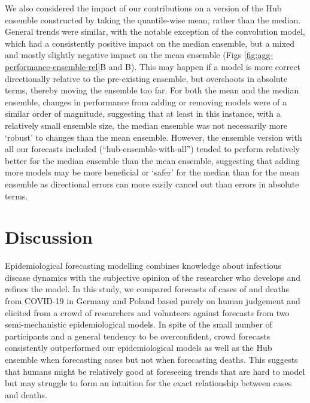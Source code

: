 \documentclass[10pt,letterpaper]{article}
\begin{document}
We also considered the impact of our contributions on a version of the
Hub ensemble constructed by taking the quantile-wise mean, rather than
the median. General trends were similar, with the notable exception of
the convolution model, which had a consistently positive impact on the
median ensemble, but a mixed and mostly slightly negative impact on the
mean ensemble (Figs \ref{fig:agg-performance-ensemble-rel}B and
B). This may happen if a
model is more correct directionally relative to the pre-existing
ensemble, but overshoots in absolute terms, thereby moving the ensemble
too far. For both the mean and the median ensemble, changes in
performance from adding or removing models were of a similar order of
magnitude, suggesting that at least in this instance, with a relatively
small ensemble size, the median ensemble was not necessarily more
`robust' to changes than the mean ensemble. However, the ensemble
version with all our forecasts included (``hub-ensemble-with-all'')
tended to perform relatively better for the median ensemble than the
mean ensemble, suggesting that adding more models may be more beneficial
or `safer' for the median than for the mean ensemble as directional
errors can more easily cancel out than errors in absolute terms.

\hypertarget{discussion}{%
\section{Discussion}\label{discussion}}

Epidemiological forecasting modelling combines knowledge about
infectious disease dynamics with the subjective opinion of the
researcher who develops and refines the model. In this study, we
compared forecasts of cases of and deaths from COVID-19 in Germany and
Poland based purely on human judgement and elicited from a crowd of
researchers and volunteers against forecasts from two semi-mechanistic
epidemiological models. In spite of the small number of participants and
a general tendency to be overconfident, crowd forecasts consistently
outperformed our epidemiological models as well as the Hub ensemble when
forecasting cases but not when forecasting deaths. This suggests that
humans might be relatively good at foreseeing trends that are hard to
model but may struggle to form an intuition for the exact relationship
between cases and deaths.
\end{document}
